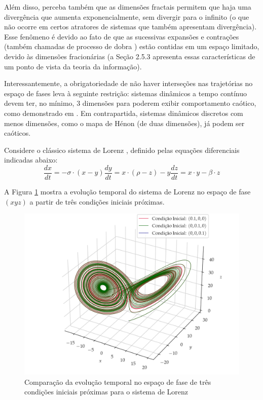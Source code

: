 \documentclass[a4paper, 12pt]{article}
\begin{document}
Além disso, perceba também que as dimensões fractais permitem que haja uma divergência que aumenta exponencialmente, sem divergir para o infinito (o que não ocorre em certos atratores de sistemas que também apresentam divergência). Esse fenômeno é devido ao fato de que as sucessivas expansões e contrações (também chamadas de processo de dobra \cite{fiedler1994caos, attux2001dinamica}) estão contidas em um espaço limitado, devido às dimensões fracionárias (a Seção 2.5.3 apresenta essas características de um ponto de vista da teoria da informação).

Interessantemente, a obrigatoriedade de não haver interseções nas trajetórias no espaço de fases leva à seguinte restrição: sistemas dinâmicos a tempo contínuo devem ter, no mínimo, $3$ dimensões para poderem exibir comportamento caótico, como demonstrado em \cite{guckenheimer2013nonlinear}. Em contrapartida, sistemas dinâmicos discretos com menos dimensões, como o mapa de Hénon (de duas dimensões), já podem ser caóticos. 

Considere o clássico sistema de Lorenz \cite{lorenz1963deterministic}, definido pelas equações diferenciais indicadas abaixo:
\begin{subequations}
\begin{equation}
\frac{dx}{dt} = -\sigma \cdot (x - y)
\end{equation}
\begin{equation}
\frac{dy}{dt} = x \cdot (\rho - z) - y
\end{equation}
\begin{equation}
\frac{dz}{dt} = x \cdot y - \beta \cdot z
\end{equation}
\end{subequations}

A Figura \ref{fig:atrator-lorenz} mostra a evolução temporal do sistema de Lorenz no espaço de fase $(xyz)$ a partir de três condições iniciais próximas.
\begin{figure}[!ht]
\centering
\includegraphics[scale = 0.7]{diagrama-de-fases-alt.png}
\caption{Comparação da evolução temporal no espaço de fase de três condições iniciais próximas para o sistema de Lorenz}
\label{fig:atrator-lorenz}
\end{figure}
\end{document}
